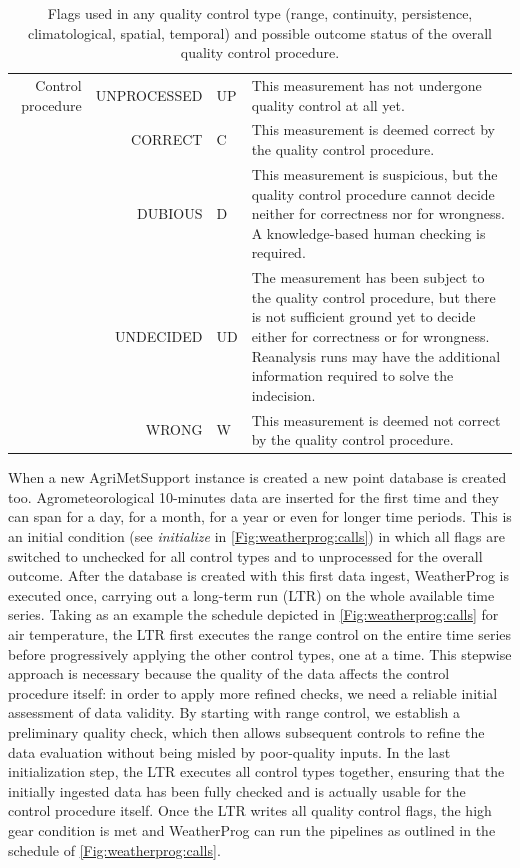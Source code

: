 \documentclass[authoryear,preprint,review,12pt]{elsarticle}
\begin{document}
\begin{table}[]
\begin{scriptsize}
\begin{tabular}{r r l p{7cm}}
	Control procedure & UNPROCESSED & UP & This measurement has not undergone quality control at all yet.\\
	& CORRECT     & C  & This measurement is deemed correct by the quality control procedure.\\
	& DUBIOUS     & D  & This measurement is suspicious, but the quality control procedure cannot decide neither for correctness nor for wrongness. A knowledge-based human checking is required. \\
	& UNDECIDED   & UD & The measurement has been subject to the quality control procedure, but there is not sufficient ground yet to decide either for correctness or for wrongness. Reanalysis runs may have the additional information required to solve the indecision.\\
	& WRONG       & W  & This measurement is deemed not correct by the quality control procedure.\\
    \hline    
    \end{tabular}
    \caption{Flags used in any quality control type (range, continuity, persistence, climatological, spatial, temporal) and possible outcome status of the overall quality control procedure.}
    \label{tab:flagsSummary}
    \end{scriptsize}
\end{table}

When a new Agri\-Met\-Support instance is created a new point database is created too.
Agrometeorological 10-minutes data are inserted for the first time and they can span for a day, for a month, for a year or even for longer time periods.
This is an initial condition (see \textit{initialize} in \cref{Fig:weatherprog:calls}) in which all flags are switched to unchecked for all control types and to unprocessed for the overall outcome.
After the database is created with this first data ingest, WeatherProg is executed once, carrying out a long-term run (LTR) on the whole available time series.
Taking as an example the schedule depicted in \cref{Fig:weatherprog:calls} for air temperature, the LTR first executes the range control on the entire time series before progressively applying the other control types, one at a time. 
This stepwise approach is necessary because the quality of the data affects the control procedure itself: in order to apply more refined checks, we need a reliable initial assessment of data validity.
By starting with range control, we establish a preliminary quality check, which then allows subsequent controls to refine the data evaluation without being misled by poor-quality inputs.
In the last initialization step, the LTR executes all control types together, ensuring that the initially ingested data has been fully checked and is actually usable for the control procedure itself.
Once the LTR writes all quality control flags, the high gear condition is met and WeatherProg can run the pipelines as outlined in the schedule of \cref{Fig:weatherprog:calls}.
\end{document}
